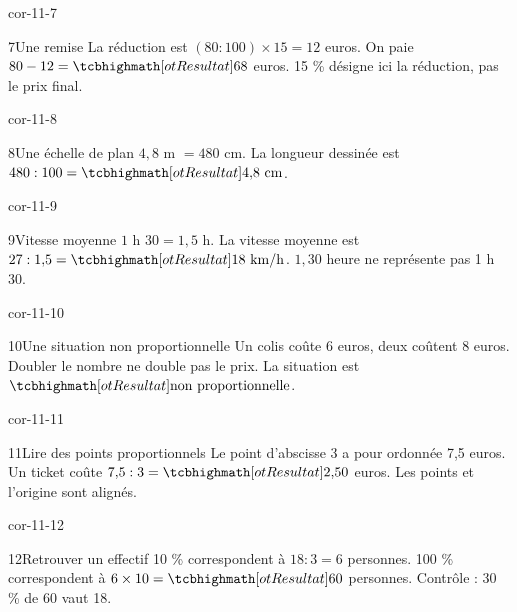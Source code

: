 \begin{blocLivre}{cor-11-7}\begin{corrige}{7}{Une remise}
La réduction est $(80:100)\times15=12$ euros. On paie $80-12=\res{68}$ euros. 15 \% désigne ici la réduction, pas le prix final.
\end{corrige}\end{blocLivre}
\begin{blocLivre}{cor-11-8}\begin{corrige}{8}{Une échelle de plan}
$4{,}8$ m $=480$ cm. La longueur dessinée est $480:100=\res{4{,}8\ \mathrm{cm}}$.
\label{fig-cor-11-8}
\end{corrige}\end{blocLivre}
\begin{blocLivre}{cor-11-9}\begin{corrige}{9}{Vitesse moyenne}
$1$ h $30=1{,}5$ h. La vitesse moyenne est $27:1{,}5=\res{18\ \mathrm{km/h}}$. $1{,}30$ heure ne représente pas 1 h 30.
\end{corrige}\end{blocLivre}
\begin{blocLivre}{cor-11-10}\begin{corrige}{10}{Une situation non proportionnelle}
Un colis coûte 6 euros, deux coûtent 8 euros. Doubler le nombre ne double pas le prix. La situation est $\res{\text{non proportionnelle}}$.
\end{corrige}\end{blocLivre}
\begin{blocLivre}{cor-11-11}\begin{corrige}{11}{Lire des points proportionnels}
Le point d’abscisse 3 a pour ordonnée 7,5 euros. Un ticket coûte $7{,}5:3=\res{2{,}50}$ euros. Les points et l’origine sont alignés.
\label{fig-cor-11-11}
\end{corrige}\end{blocLivre}
\begin{blocLivre}{cor-11-12}\begin{corrige}{12}{Retrouver un effectif}
10 \% correspondent à $18:3=6$ personnes. 100 \% correspondent à $6\times10=\res{60}$ personnes. Contrôle : 30 \% de 60 vaut 18.
\end{corrige}\end{blocLivre}
